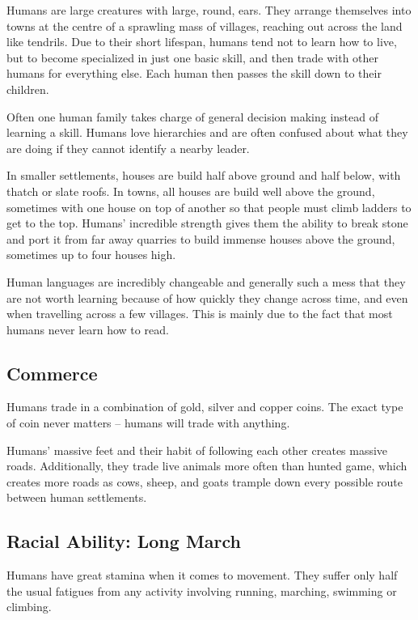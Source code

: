 \begin{multicols}{2}

\noindent
Humans are large creatures with large, round, ears.
They arrange themselves into towns at the centre of a sprawling mass of villages, reaching out across the land like tendrils.
Due to their short lifespan, humans tend not to learn how to live, but to become specialized in just one basic skill, and then trade with other humans for everything else.
Each human then passes the skill down to their children.

Often one human family takes charge of general decision making instead of learning a skill.
Humans love hierarchies and are often confused about what they are doing if they cannot identify a nearby leader.

In smaller settlements, houses are build half above ground and half below, with thatch or slate roofs.
In towns, all houses are build well above the ground, sometimes with one house on top of another so that people must climb ladders to get to the top.
Humans' incredible strength gives them the ability to break stone and port it from far away quarries to build immense houses above the ground, sometimes up to four houses high.

Human languages are incredibly changeable and generally such a mess that they are not worth learning because of how quickly they change across time, and even when travelling across a few villages.
This is mainly due to the fact that most humans never learn how to read.

\subsection{Commerce}

Humans trade in a combination of gold, silver and copper coins.
The exact type of coin never matters -- humans will trade with anything.

Humans' massive feet and their habit of following each other creates massive roads.
Additionally, they trade live animals more often than hunted game, which creates more roads as cows, sheep, and goats trample down every possible route between human settlements.

\subsection{Racial Ability: Long March}

Humans have great stamina when it comes to movement.
They suffer only half the usual \glspl{fatigue} from any activity involving running, marching, swimming or climbing.


\end{multicols}
